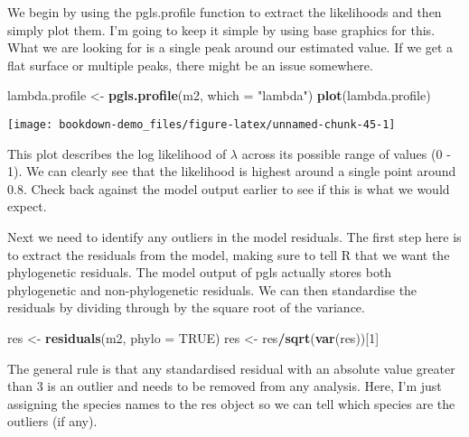 \documentclass[]{book}
\newenvironment{Shaded}{\begin{snugshade}}{\end{snugshade}}
\newcommand{\KeywordTok}[1]{\textcolor[rgb]{0.13,0.29,0.53}{\textbf{#1}}}
\newcommand{\DataTypeTok}[1]{\textcolor[rgb]{0.13,0.29,0.53}{#1}}
\newcommand{\DecValTok}[1]{\textcolor[rgb]{0.00,0.00,0.81}{#1}}
\newcommand{\StringTok}[1]{\textcolor[rgb]{0.31,0.60,0.02}{#1}}
\newcommand{\OtherTok}[1]{\textcolor[rgb]{0.56,0.35,0.01}{#1}}
\newcommand{\OperatorTok}[1]{\textcolor[rgb]{0.81,0.36,0.00}{\textbf{#1}}}
\newcommand{\NormalTok}[1]{#1}
\begin{document}
We begin by using the pgls.profile function to extract the likelihoods
and then simply plot them. I'm going to keep it simple by using base
graphics for this. What we are looking for is a single peak around our
estimated value. If we get a flat surface or multiple peaks, there might
be an issue somewhere.

\begin{Shaded}
\begin{Highlighting}[]
\NormalTok{lambda.profile <-}\StringTok{ }\KeywordTok{pgls.profile}\NormalTok{(m2, }\DataTypeTok{which =} \StringTok{"lambda"}\NormalTok{)}
\KeywordTok{plot}\NormalTok{(lambda.profile)}
\end{Highlighting}
\end{Shaded}

\begin{center}\texttt{[image: bookdown-demo\_files/figure-latex/unnamed-chunk-45-1]} \end{center}

This plot describes the log likelihood of \(\lambda\) across its
possible range of values (0 - 1). We can clearly see that the likelihood
is highest around a single point around 0.8. Check back against the
model output earlier to see if this is what we would expect.

Next we need to identify any outliers in the model residuals. The first
step here is to extract the residuals from the model, making sure to
tell R that we want the phylogenetic residuals. The model output of pgls
actually stores both phylogenetic and non-phylogenetic residuals. We can
then standardise the residuals by dividing through by the square root of
the variance.

\begin{Shaded}
\begin{Highlighting}[]
\NormalTok{res <-}\StringTok{ }\KeywordTok{residuals}\NormalTok{(m2, }\DataTypeTok{phylo =} \OtherTok{TRUE}\NormalTok{)}
\NormalTok{res <-}\StringTok{ }\NormalTok{res}\OperatorTok{/}\KeywordTok{sqrt}\NormalTok{(}\KeywordTok{var}\NormalTok{(res))[}\DecValTok{1}\NormalTok{]}
\end{Highlighting}
\end{Shaded}

The general rule is that any standardised residual with an absolute
value greater than 3 is an outlier and needs to be removed from any
analysis. Here, I'm just assigning the species names to the res object
so we can tell which species are the outliers (if any).

\begin{Shaded}
\end{Shaded}
\end{document}
